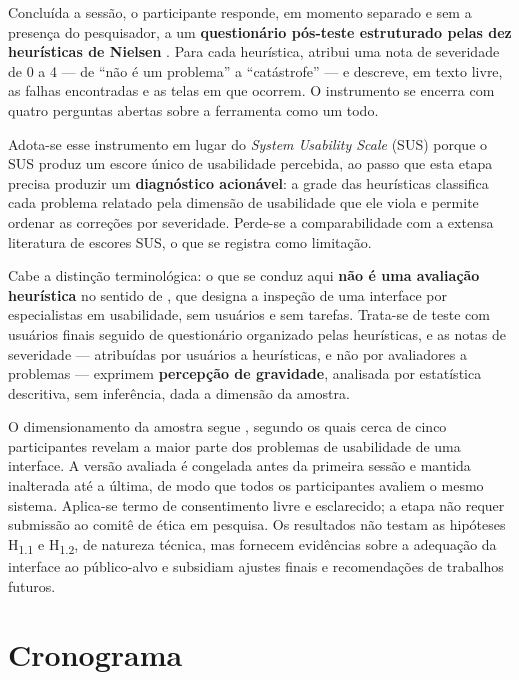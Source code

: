 Concluída a sessão, o participante responde, em momento separado e sem a
presença do pesquisador, a um \textbf{questionário pós-teste estruturado
pelas dez heurísticas de Nielsen} \citep{Nielsen1994}. Para cada
heurística, atribui uma nota de severidade de 0 a 4 --- de ``não é um
problema'' a ``catástrofe'' --- e descreve, em texto livre, as falhas
encontradas e as telas em que ocorrem. O instrumento se encerra com
quatro perguntas abertas sobre a ferramenta como um todo.

Adota-se esse instrumento em lugar do \emph{System Usability Scale}
(SUS) \citep{Brooke1996} porque o SUS produz um escore único de
usabilidade percebida, ao passo que esta etapa precisa produzir um
\textbf{diagnóstico acionável}: a grade das heurísticas classifica cada
problema relatado pela dimensão de usabilidade que ele viola e permite
ordenar as correções por severidade. Perde-se a comparabilidade com a
extensa literatura de escores SUS, o que se registra como limitação.

Cabe a distinção terminológica: o que se conduz aqui \textbf{não é uma
avaliação heurística} no sentido de \cite{NielsenMolich1990}, que designa
a inspeção de uma interface por especialistas em usabilidade, sem
usuários e sem tarefas. Trata-se de teste com usuários finais seguido de
questionário organizado pelas heurísticas, e as notas de severidade ---
atribuídas por usuários a heurísticas, e não por avaliadores a problemas
--- exprimem \textbf{percepção de gravidade}, analisada por estatística
descritiva, sem inferência, dada a dimensão da amostra.

O dimensionamento da amostra segue \cite{NielsenLandauer1993}, segundo os
quais cerca de cinco participantes revelam a maior parte dos problemas de
usabilidade de uma interface. A versão avaliada é congelada antes da
primeira sessão e mantida inalterada até a última, de modo que todos os
participantes avaliem o mesmo sistema. Aplica-se termo de consentimento
livre e esclarecido; a etapa não requer submissão ao comitê de ética em
pesquisa. Os resultados não testam as hipóteses H\textsubscript{1.1} e
H\textsubscript{1.2}, de natureza técnica, mas fornecem evidências sobre
a adequação da interface ao público-alvo e subsidiam ajustes finais e
recomendações de trabalhos futuros.

\section{Cronograma}\label{sec:cronograma}


